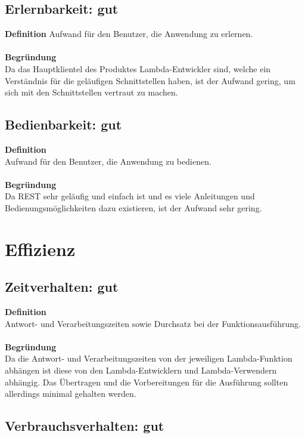\documentclass[a4paper,20pt,oneside]{book}
\begin{document}
\subsection{Erlernbarkeit: gut}

\textbf{Definition} Aufwand für den Benutzer, die Anwendung zu erlernen. \\ \\
\textbf{Begründung} \\
Da das Hauptklientel des Produktes \gls{Lambda-Entwickler} sind, welche ein Verständnis für die geläufigen Schnittstellen haben, ist der Aufwand gering, um sich mit den Schnittstellen vertraut zu machen.

\subsection{Bedienbarkeit: gut}

\textbf{Definition} \\
Aufwand für den Benutzer, die Anwendung zu bedienen. \\ \\
\textbf{Begründung} \\
Da \gls{REST} sehr geläufig und einfach ist und es viele Anleitungen und Bedienungsmöglichkeiten dazu existieren, ist der Aufwand sehr gering.
\\
\section{Effizienz}

\subsection{Zeitverhalten: gut}

\textbf{Definition} \\
Antwort- und Verarbeitungszeiten sowie Durchsatz bei der Funktionsausführung. \\ \\
\textbf{Begründung} \\
Da die Antwort- und Verarbeitungszeiten von der jeweiligen \gls{Lambda-Funktion} abhängen ist diese von den \gls{Lambda-Entwickler}n und \gls{Lambda-Verwender}n abhängig. Das Übertragen und die Vorbereitungen für die Ausführung sollten allerdings minimal gehalten werden.

\subsection{Verbrauchsverhalten: gut}
\end{document}
